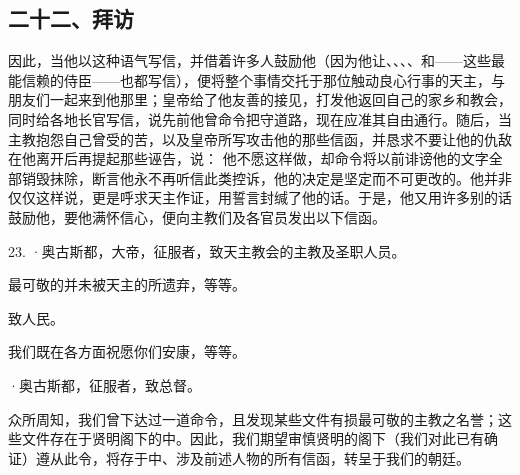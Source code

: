 
\subsection{二十二、拜访}

因此，当他以这种语气写信，并借着许多人鼓励他（因为他让、、、、和——这些最能信赖的侍臣——也都写信），便将整个事情交托于那位触动良心行事的天主，与朋友们一起来到他那里；皇帝给了他友善的接见，打发他返回自己的家乡和教会，同时给各地长官写信，说先前他曾命令把守道路，现在应准其自由通行。随后，当主教抱怨自己曾受的苦，以及皇帝所写攻击他的那些信函，并恳求不要让他的仇敌在他离开后再提起那些诬告，说： 他不愿这样做，却命令将以前诽谤他的文字全部销毁抹除，断言他永不再听信此类控诉，他的决定是坚定而不可更改的。他并非仅仅这样说，更是呼求天主作证，用誓言封缄了他的话。于是，他又用许多别的话鼓励他，要他满怀信心，便向主教们及各官员发出以下信函。\par

23. ·奥古斯都，大帝，征服者，致天主教会的主教及圣职人员。\par

最可敬的并未被天主的所遗弃，等等。\par

\par

致人民。\par

我们既在各方面祝愿你们安康，等等。\par

\par

·奥古斯都，征服者，致总督。\par

众所周知，我们曾下达过一道命令，且发现某些文件有损最可敬的主教之名誉；这些文件存在于贤明阁下的中。因此，我们期望审慎贤明的阁下（我们对此已有确证）遵从此令，将存于中、涉及前述人物的所有信函，转呈于我们的朝廷。\par

